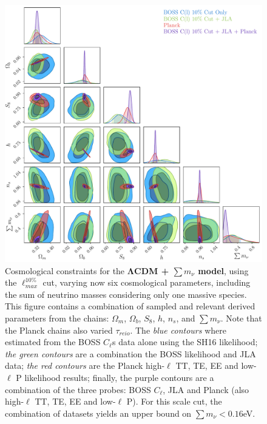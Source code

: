 \begin{figure}
\begin{center}
\includegraphics[width=\textwidth]{BOSS-FIGS/1Spec_Neutrino_NewPrior_LCDM_10pc.pdf}
\caption[Cosmological constraints for the $\Lambda$CDM + $\sum m_{\nu}$ model, using the $\ell_{max}^{10\%}$ cut]{Cosmological constraints for the \textbf{$\mathbf{\Lambda}$CDM + $\sum m_{\nu}$ model}, using the $\ell_{max}^{10\%}$ cut, varying now six cosmological parameters, including the sum of neutrino masses considering only one massive species. This figure contains a combination of sampled and relevant derived parameters from the chains: $\Omega_m$, $\Omega_b$, $S_8$, $h$, $n_s$, and $\sum m_{\nu}$. Note that the Planck chains also varied $\tau_{reio}$. The \textit{blue contours} where estimated from the BOSS $C_{\ell}$s data alone using the SH16 likelihood; \textit{the green contours} are a combination the BOSS likelihood and JLA data; \textit{the red contours} are the Planck high-$\ell$ TT, TE, EE and low-$\ell$ P likelihood results; finally, the purple contours are a combination of the three probes: BOSS $C_{\ell}$, JLA and Planck (also high-$\ell$ TT, TE, EE and low-$\ell$ P). For this scale cut, the combination of datasets yields an upper bound on $\sum m_{\nu} < 0.16$eV.}
\label{fig:nuCDM10pc}
\end{center}
\end{figure}


